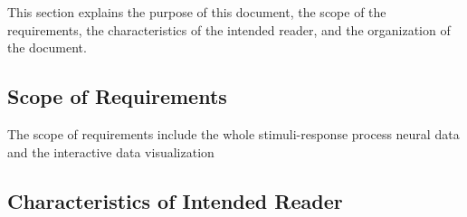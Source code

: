 \documentclass[12pt]{article}
\providecommand{\DIFaddend}{} %
\DeclareRobustCommand{\DIFaddend}{\DIFOaddend \let\includegraphics\DIFOincludegraphics} %
\begin{document}
\DIFaddend This section explains the purpose of this
document, the scope of the requirements, the characteristics of the intended reader, and the
organization of the document.


\subsection{Scope of Requirements}

The scope of requirements include the whole stimuli-response process neural data
and the interactive data visualization
%
%

\subsection{Characteristics of Intended Reader} \label{sec_IntendedReader}
\end{document}
